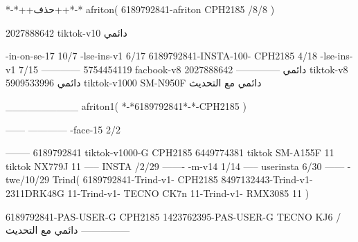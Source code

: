 *-*++حذف++*-*
afriton(
6189792841-afriton CPH2185  /8/8
)

2027888642 tiktok-v10
دائمي

-in-on-se-17 10/7
-lse-ins-v1 6/17
6189792841-INSTA-100- CPH2185 4/18
-lse-ins-v1 7/15
------------
5754454119 facbook-v8
دائمي
--------------
2027888642 tiktok-v8
دائمي
5909533996 tiktok-v1000  SM-N950F
دائمي مع التحديث

__________
afriton1(
*-*6189792841*-*-CPH2185
)


------
------------
-face-15 2/2

--------
6189792841 tiktok-v1000-G CPH2185 
6449774381 tiktok   SM-A155F 11 tiktok   NX779J 11\6
-----
 INSTA /2/29
-------
-m-v14 1/14
-----
userinsta 6/30
------
-twe/10/29
Trind(
6189792841-Trind-v1- CPH2185 
8497132443-Trind-v1- 2311DRK48G 11-Trind-v1- TECNO CK7n 11-Trind-v1- RMX3085 11\1
)


6189792841-PAS-USER-G CPH2185 
1423762395-PAS-USER-G TECNO KJ6  /دائمي مع التحديث
    ---------------
